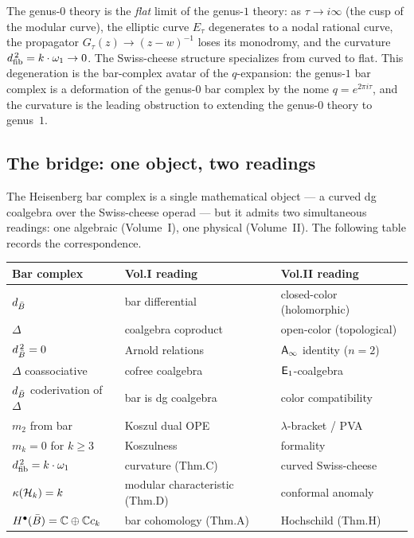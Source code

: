 \begin{remark}
\label{rem:rosetta-flat-limit}
The genus-$0$ theory is the \emph{flat} limit of the genus-$1$
theory: as $\tau \to i\infty$ (the cusp of the modular curve),
the elliptic curve $E_\tau$ degenerates to a nodal rational curve,
the propagator $G_\tau(z) \to (z - w)^{-1}$ loses its monodromy,
and the curvature $d_{\mathrm{fib}}^{\,2} = k \cdot \omega_1 \to 0$.  The
Swiss-cheese structure specializes from curved to flat.  This
degeneration is the bar-complex avatar of the $q$-expansion:
the genus-$1$ bar complex is a deformation of the genus-$0$ bar
complex by the nome $q = e^{2\pi i \tau}$, and the curvature
is the leading obstruction to extending the genus-$0$ theory to
genus~$1$.
\end{remark}


\subsection{The bridge: one object, two readings}
\label{subsec:rosetta-bridge}

The Heisenberg bar complex is a single mathematical object --- a
curved dg coalgebra over the Swiss-cheese operad --- but it admits
two simultaneous readings: one algebraic (Volume~I), one physical
(Volume~II).  The following table records the correspondence.

\begin{center}
\small
\renewcommand{\arraystretch}{1.25}
\begin{tabular}{@{}l@{\;\;}l@{\;\;}l@{}}
\textbf{Bar complex} & \textbf{Vol.\@ I reading} &
  \textbf{Vol.\@ II reading} \\
\hline
$d_{\bar{B}}$
  & bar differential
  & closed-color (holomorphic) \\[2pt]
$\Delta$
  & coalgebra coproduct
  & open-color (topological) \\[2pt]
$d_{\bar{B}}^{\,2} = 0$
  & Arnold relations
  & $\mathsf{A}_{\infty}$ identity ($n = 2$) \\[2pt]
$\Delta$ coassociative
  & cofree coalgebra
  & $\mathsf{E}_1$-coalgebra \\[2pt]
$d_{\bar{B}}$ coderivation of $\Delta$
  & bar is dg coalgebra
  & color compatibility \\[2pt]
$m_2$ from bar
  & Koszul dual OPE
  & $\lambda$-bracket / PVA \\[2pt]
$m_k = 0$ for $k \geq 3$
  & Koszulness
  & formality \\[2pt]
$d_{\mathrm{fib}}^{\,2} = k \cdot \omega_1$
  & curvature (Thm.\@ C)
  & curved Swiss-cheese \\[2pt]
$\kappa(\mathcal{H}_k) = k$
  & modular characteristic (Thm.\@ D)
  & conformal anomaly \\[2pt]
$H^{\bullet}(\bar{B}) = \mathbb{C} \oplus \mathbb{C} c_k$
  & bar cohomology (Thm.\@ A)
  & Hochschild (Thm.\@ H)
\end{tabular}
\end{center}

